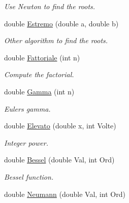 \begin{DoxyCompactItemize}
\begin{DoxyCompactList}\small\item\em Use Newton to find the roots. \end{DoxyCompactList}\item 
double \hyperlink{classMatematica_a72c0cbce789095808b5c49d3f7f8fee8}{Estremo} (double a, double b)\hypertarget{classMatematica_a72c0cbce789095808b5c49d3f7f8fee8}{}\label{classMatematica_a72c0cbce789095808b5c49d3f7f8fee8}

\begin{DoxyCompactList}\small\item\em Other algorithm to find the roots. \end{DoxyCompactList}\item 
double \hyperlink{classMatematica_a28deb4e354f861587181caac4a5b9857}{Fattoriale} (int n)\hypertarget{classMatematica_a28deb4e354f861587181caac4a5b9857}{}\label{classMatematica_a28deb4e354f861587181caac4a5b9857}

\begin{DoxyCompactList}\small\item\em Compute the factorial. \end{DoxyCompactList}\item 
double \hyperlink{classMatematica_a0a9c482dfadf895f3b52888b33121c43}{Gamma} (int n)\hypertarget{classMatematica_a0a9c482dfadf895f3b52888b33121c43}{}\label{classMatematica_a0a9c482dfadf895f3b52888b33121c43}

\begin{DoxyCompactList}\small\item\em Euler\textquotesingle{}s gamma. \end{DoxyCompactList}\item 
double \hyperlink{classMatematica_a81f44d652f61225a2725c0cb3cbc9524}{Elevato} (double x, int Volte)\hypertarget{classMatematica_a81f44d652f61225a2725c0cb3cbc9524}{}\label{classMatematica_a81f44d652f61225a2725c0cb3cbc9524}

\begin{DoxyCompactList}\small\item\em Integer power. \end{DoxyCompactList}\item 
double \hyperlink{classMatematica_af0a86b99b1cdbff64505cdef059e6d15}{Bessel} (double Val, int Ord)\hypertarget{classMatematica_af0a86b99b1cdbff64505cdef059e6d15}{}\label{classMatematica_af0a86b99b1cdbff64505cdef059e6d15}

\begin{DoxyCompactList}\small\item\em Bessel function. \end{DoxyCompactList}\item 
double \hyperlink{classMatematica_a9dce8aab3f083e3071a47fa4d2b1b582}{Neumann} (double Val, int Ord)\hypertarget{classMatematica_a9dce8aab3f083e3071a47fa4d2b1b582}{}\label{classMatematica_a9dce8aab3f083e3071a47fa4d2b1b582}


\end{DoxyCompactItemize}
